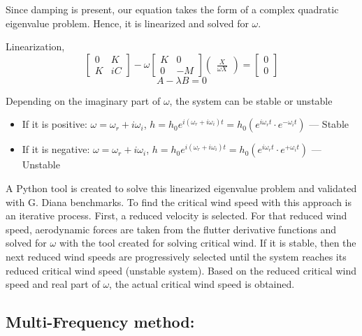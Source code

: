 \documentclass[a4paper, 12pt]{report}
\begin{document}
Since damping is present, our equation takes the form of a complex quadratic eigenvalue problem. Hence, it is linearized and solved for $\omega$.

Linearization,
\begin{equation}
    \begin{bmatrix} 0 & K \\ K & iC \end{bmatrix}
    - \omega \begin{bmatrix} K & 0 \\ 0 & -M \end{bmatrix}
    \begin{pmatrix} \frac{X}{\omega X} \end{pmatrix}
    = \begin{bmatrix} 0 \\ 0 \end{bmatrix}
\end{equation}
\begin{equation}
    A - \lambda B = 0
\end{equation}

Depending on the imaginary part of $\omega$, the system can be stable or unstable
\begin{itemize}
    \setlength{\itemsep}{10pt}
    \item[$\bullet$] If it is positive: $\omega = \omega_r + i\omega_i$, \quad $h = h_0 e^{i(\omega_r + i\omega_i)t} = h_0 (e^{i\omega_r t} \cdot e^{-\omega_i t})$ --- Stable
    \item[$\bullet$] If it is negative: $\omega = \omega_r + i\omega_i$, \quad $h = h_0 e^{i(\omega_r + i\omega_i)t} = h_0 (e^{i\omega_r t} \cdot e^{+\omega_i t})$ --- Unstable
\end{itemize}

A Python tool is created to solve this linearized eigenvalue problem and validated with G. Diana benchmarks. To find the critical wind speed with this approach is an iterative process. First, a reduced velocity is selected. For that reduced wind speed, aerodynamic forces are taken from the flutter derivative functions and solved for $\omega$ with the tool created for solving critical wind. If it is stable, then the next reduced wind speeds are progressively selected until the system reaches its reduced critical wind speed (unstable system). Based on the reduced critical wind speed and real part of $\omega$, the actual critical wind speed is obtained.


\subsection*{Multi-Frequency method:}
\end{document}
